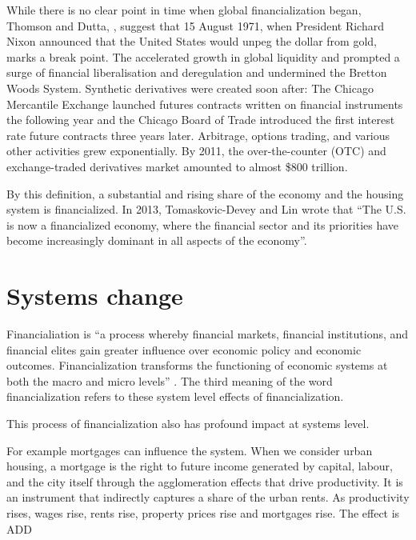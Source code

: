 While there is no clear point in time when global financialization began, Thomson and Dutta,  \cite{thomsonFinancialisationPrimer2018}, suggest that 15 August 1971, when President Richard Nixon announced that the United States would unpeg the dollar from gold, marks a break point. The accelerated growth in global liquidity and prompted a surge of financial liberalisation and deregulation and undermined the Bretton Woods System.  Synthetic derivatives were created soon after: The Chicago Mercantile Exchange launched futures contracts written on financial instruments the following year and the Chicago Board of Trade introduced the first interest rate future contracts three years later. Arbitrage, options trading, and various other activities grew exponentially. By 2011, the over-the-counter (OTC) and exchange-traded derivatives market amounted to almost \$800 trillion.  %

By this definition, a substantial and rising share of the economy and the housing system is financialized. 
In 2013, Tomaskovic-Devey and Lin wrote that ``The U.S. is now a financialized economy, where the financial sector and its priorities have become increasingly dominant in all aspects of the economy''\cite{tomaskovic-deveyFinancializationCausesInequality2013}. 


\section{Systems change}
Financialiation is %
``a process whereby financial markets, financial institutions, and financial elites gain greater influence over economic policy and economic outcomes. Financialization transforms the functioning of economic systems at both the macro and micro levels'' \cite{palleyFinancializationWhatIt2007}. 
The third meaning of the word financialization refers to these system level effects of financialization. 

This process of financialization also has profound impact at systems level. 



For example mortgages can influence the system. When we consider urban housing, a mortgage is the right to future income generated by capital, labour, and the city itself through the agglomeration effects that drive productivity. It is an instrument that indirectly captures a share of the urban rents. As productivity rises, wages rise, rents rise, property prices rise and mortgages rise. The effect is ADD

